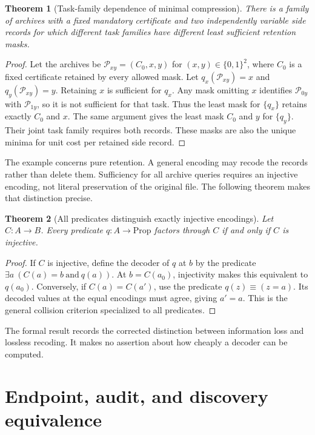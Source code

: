 \documentclass[11pt,oneside]{article}
\theoremstyle{komorebiplain}
\newtheorem{theorem}{Theorem}[section]
\theoremstyle{komorebidefinition}
\theoremstyle{komorebiremark}
\newcommand{\Pcal}{\mathcal P}
\begin{document}
\begin{theorem}[Task-family dependence of minimal compression]
\label{res:7:10}
There is a family of archives with a fixed mandatory certificate and two independently variable side records for which different task families have different least sufficient retention masks.
\end{theorem}

\begin{proof}
Let the archives be $\Pcal_{xy}=(C_0,x,y)$ for $(x,y)\in\{0,1\}^2$, where $C_0$ is a fixed certificate retained by every allowed mask. Let $q_x(\Pcal_{xy})=x$ and $q_y(\Pcal_{xy})=y$. Retaining $x$ is sufficient for $q_x$. Any mask omitting $x$ identifies $\Pcal_{0y}$ with $\Pcal_{1y}$, so it is not sufficient for that task. Thus the least mask for $\{q_x\}$ retains exactly $C_0$ and $x$. The same argument gives the least mask $C_0$ and $y$ for $\{q_y\}$. Their joint task family requires both records. These masks are also the unique minima for unit cost per retained side record.
\end{proof}

The example concerns pure retention. A general encoding may recode the records rather than delete them. Sufficiency for all archive queries requires an injective encoding, not literal preservation of the original file. The following theorem makes that distinction precise.

\begin{theorem}[All predicates distinguish exactly injective encodings]
\label{res:7:11}
\label{thm:injective-compression}
Let $C:A\to B$. Every predicate $q:A\to\mathrm{Prop}$ factors through $C$ if and only if $C$ is injective.
\end{theorem}
\begin{proof}
If $C$ is injective, define the decoder of $q$ at $b$ by the predicate $\exists a\ (C(a)=b\ \text{and}\ q(a))$. At $b=C(a_0)$, injectivity makes this equivalent to $q(a_0)$. Conversely, if $C(a)=C(a')$, use the predicate $q(z)\equiv(z=a)$. Its decoded values at the equal encodings must agree, giving $a'=a$. This is the general collision criterion specialized to all predicates.
\end{proof}

The formal result  records the corrected distinction between information loss and lossless recoding. It makes no assertion about how cheaply a decoder can be computed.


\section{Endpoint, audit, and discovery equivalence}
\label{sec:old8}
\end{document}
